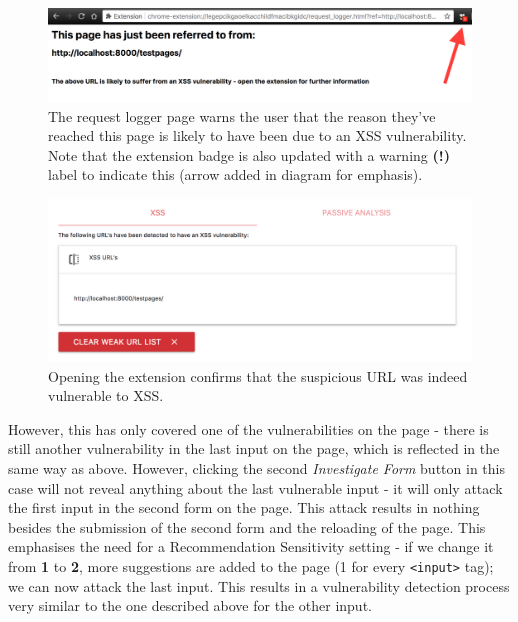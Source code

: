 \begin{figure}[h]
	\centering
	\includegraphics[width=	\textwidth]{images/request_logger_warning.png}
	\caption{The request logger page warns the user that the reason they've reached this page is likely to have been due to an XSS vulnerability. Note that the extension badge is also updated with a warning \textbf{(!)} label to indicate this (arrow added in diagram for emphasis).}
	\label{fig:request_logger_warning}
\end{figure}

\begin{figure}[h]
	\centering
	\includegraphics[width=	\textwidth]{images/xss_vulnerable_url.png}
	\caption{Opening the extension confirms that the suspicious URL was indeed vulnerable to XSS.}
	\label{fig:xss_vulnerable_url}
\end{figure}

However, this has only covered one of the vulnerabilities on the page - there is still another vulnerability in the last input on the page, which is reflected in the same way as above. However, clicking the second \textit{Investigate Form} button in this case will not reveal anything about the last vulnerable input - it will only attack the first input in the second form on the page. This attack results in nothing besides the submission of the second form and the reloading of the page. This emphasises the need for a Recommendation Sensitivity setting - if we change it from \textbf{1} to \textbf{2}, more suggestions are added to the page (1 for every \texttt{<input>} tag); we can now attack the last input. This results in a vulnerability detection process very similar to the one described above for the other input.   


